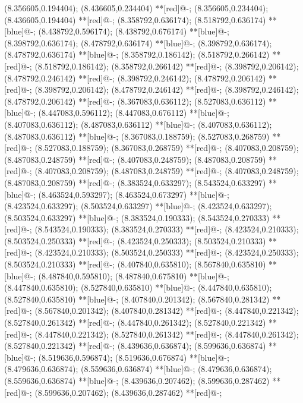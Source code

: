 (8.356605,0.194404); (8.436605,0.234404) **[red]@{-};
(8.356605,0.234404); (8.436605,0.194404) **[red]@{-};
(8.358792,0.636174); (8.518792,0.636174) **[blue]@{-};
(8.438792,0.596174); (8.438792,0.676174) **[blue]@{-};
(8.398792,0.636174); (8.478792,0.636174) **[blue]@{-};
(8.398792,0.636174); (8.478792,0.636174) **[blue]@{-};
(8.358792,0.186142); (8.518792,0.266142) **[red]@{-};
(8.518792,0.186142); (8.358792,0.266142) **[red]@{-};
(8.398792,0.206142); (8.478792,0.246142) **[red]@{-};
(8.398792,0.246142); (8.478792,0.206142) **[red]@{-};
(8.398792,0.206142); (8.478792,0.246142) **[red]@{-};
(8.398792,0.246142); (8.478792,0.206142) **[red]@{-};
(8.367083,0.636112); (8.527083,0.636112) **[blue]@{-};
(8.447083,0.596112); (8.447083,0.676112) **[blue]@{-};
(8.407083,0.636112); (8.487083,0.636112) **[blue]@{-};
(8.407083,0.636112); (8.487083,0.636112) **[blue]@{-};
(8.367083,0.188759); (8.527083,0.268759) **[red]@{-};
(8.527083,0.188759); (8.367083,0.268759) **[red]@{-};
(8.407083,0.208759); (8.487083,0.248759) **[red]@{-};
(8.407083,0.248759); (8.487083,0.208759) **[red]@{-};
(8.407083,0.208759); (8.487083,0.248759) **[red]@{-};
(8.407083,0.248759); (8.487083,0.208759) **[red]@{-};
(8.383524,0.633297); (8.543524,0.633297) **[blue]@{-};
(8.463524,0.593297); (8.463524,0.673297) **[blue]@{-};
(8.423524,0.633297); (8.503524,0.633297) **[blue]@{-};
(8.423524,0.633297); (8.503524,0.633297) **[blue]@{-};
(8.383524,0.190333); (8.543524,0.270333) **[red]@{-};
(8.543524,0.190333); (8.383524,0.270333) **[red]@{-};
(8.423524,0.210333); (8.503524,0.250333) **[red]@{-};
(8.423524,0.250333); (8.503524,0.210333) **[red]@{-};
(8.423524,0.210333); (8.503524,0.250333) **[red]@{-};
(8.423524,0.250333); (8.503524,0.210333) **[red]@{-};
(8.407840,0.635810); (8.567840,0.635810) **[blue]@{-};
(8.487840,0.595810); (8.487840,0.675810) **[blue]@{-};
(8.447840,0.635810); (8.527840,0.635810) **[blue]@{-};
(8.447840,0.635810); (8.527840,0.635810) **[blue]@{-};
(8.407840,0.201342); (8.567840,0.281342) **[red]@{-};
(8.567840,0.201342); (8.407840,0.281342) **[red]@{-};
(8.447840,0.221342); (8.527840,0.261342) **[red]@{-};
(8.447840,0.261342); (8.527840,0.221342) **[red]@{-};
(8.447840,0.221342); (8.527840,0.261342) **[red]@{-};
(8.447840,0.261342); (8.527840,0.221342) **[red]@{-};
(8.439636,0.636874); (8.599636,0.636874) **[blue]@{-};
(8.519636,0.596874); (8.519636,0.676874) **[blue]@{-};
(8.479636,0.636874); (8.559636,0.636874) **[blue]@{-};
(8.479636,0.636874); (8.559636,0.636874) **[blue]@{-};
(8.439636,0.207462); (8.599636,0.287462) **[red]@{-};
(8.599636,0.207462); (8.439636,0.287462) **[red]@{-};
